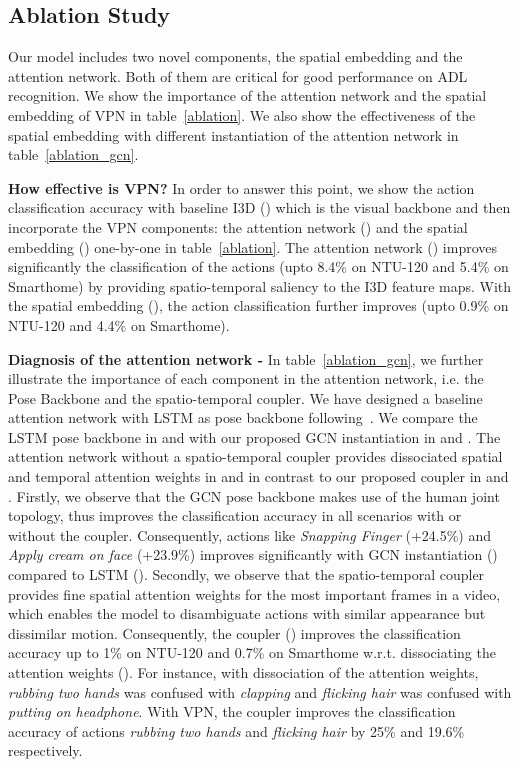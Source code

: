 \documentclass[runningheads]{llncs}
\begin{document}
\subsection{Ablation Study}
\vspace{-0.1 in}
Our model includes two novel components, the spatial embedding and the attention network. Both of them are critical for good performance on ADL recognition. We show the importance of the attention network and the spatial embedding of VPN in table~\ref{ablation}. We also show the effectiveness of the spatial embedding with different instantiation of the attention network in table~\ref{ablation_gcn}.  



\noindent \textbf{How effective is VPN?}
In order to answer this point, we show the action classification accuracy with baseline I3D () which is the visual backbone and then incorporate the VPN components: the attention network () and the spatial embedding () one-by-one in table~\ref{ablation}. The attention network () improves significantly the classification of the actions (upto 8.4\% on NTU-120 and 5.4\% on Smarthome) by providing spatio-temporal saliency to the I3D feature maps. With the spatial embedding (), the action classification further improves (upto 0.9\% on NTU-120 and 4.4\% on Smarthome).





\noindent \textbf{Diagnosis of the attention network -}
In table~\ref{ablation_gcn}, we further illustrate the importance of each component in the attention network, i.e. the Pose Backbone and the spatio-temporal coupler.
We have designed a baseline attention network with LSTM as pose backbone following~\cite{STA_iccv}. We compare the LSTM pose backbone in  and  with our proposed GCN instantiation in  and . The attention network without a spatio-temporal coupler provides dissociated spatial and temporal attention weights in  and  in contrast to our proposed coupler in  and .
Firstly, we observe that the GCN pose backbone makes use of the human joint topology, thus improves the classification accuracy in all scenarios with or without the coupler. Consequently, actions like \textit{Snapping Finger} (+24.5\%) and \textit{Apply cream on face} (+23.9\%) improves significantly with GCN instantiation () compared to LSTM ().
Secondly, we observe that the spatio-temporal coupler provides fine spatial attention weights for the most important frames in a video, which enables the model to disambiguate actions with similar appearance but dissimilar motion. Consequently, the coupler () improves the classification accuracy up to 1\% on NTU-120 and 0.7\% on Smarthome w.r.t. dissociating the attention weights (). 
For instance, with dissociation of the attention weights, \textit{rubbing two hands} was confused with \textit{clapping} and \textit{flicking hair} was confused with \textit{putting on headphone}.
With VPN, the coupler improves the classification accuracy of actions \textit{rubbing two hands} and \textit{flicking hair} by 25\% and 19.6\% respectively. 
\end{document}
